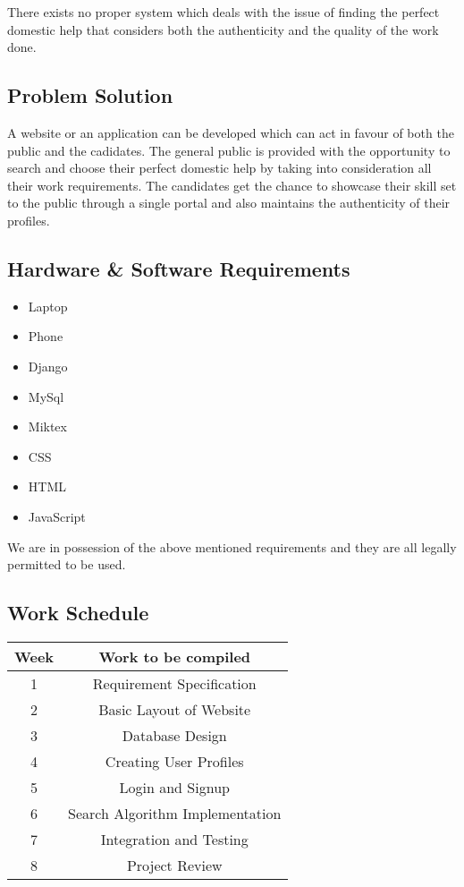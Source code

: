 \documentclass[a4paper]{article}
\begin{document}
There exists no proper system which deals with the issue of finding the perfect domestic help that considers both the authenticity and the quality of the work done.

\subsection{Problem Solution}

A website or an application can be developed which can act in favour of both the public and the cadidates. 
The general public is provided with the opportunity to search and choose their perfect domestic help by taking into consideration all their work requirements. 
The candidates get the chance to showcase their skill set to the public through a single portal and also maintains the authenticity of their profiles. 


\subsection{Hardware \& Software Requirements}

\begin{itemize}
\item Laptop
\item Phone
\item Django
\item MySql
\item Miktex
\item CSS
\item HTML
\item JavaScript
\end{itemize}

We are in possession of the above mentioned requirements and they are all legally permitted to be used.

\subsection{Work Schedule}


\begin{center}
\begin{tabular}{ |c|c| } 
 \hline
 Week & Work to be compiled \\  \hline
 1 & Requirement Specification \\  \hline
 2 & Basic Layout of Website\\  \hline
 3 & Database Design\\  \hline
 4 & Creating User Profiles\\  \hline
 5 & Login and Signup\\  \hline
 6 & Search Algorithm Implementation\\  \hline
 7 & Integration and Testing\\  \hline
 8 & Project Review\\  \hline
 \hline
\end{tabular}
\end{center}
\end{document}
